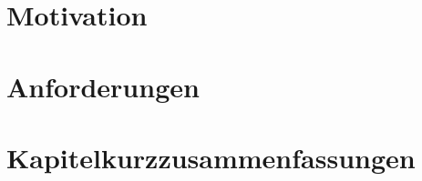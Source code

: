 %
\section{Motivation}
\label{chap:motivation}

%
\section{Anforderungen}
\label{chap:anforderungen}

%
\section{Kapitelkurzzusammenfassungen}
\label{chap:kapitel}

%
